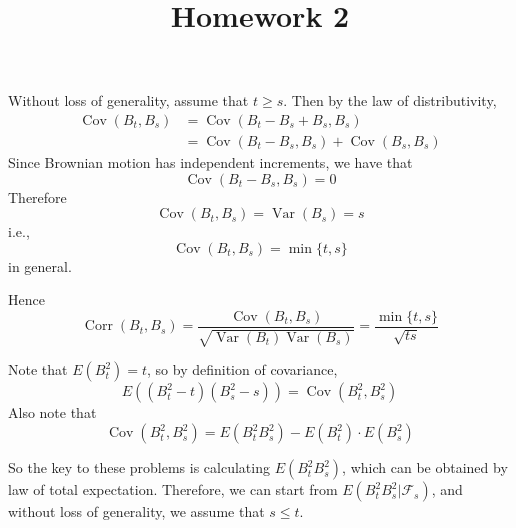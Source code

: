 \documentclass{homework}
\title{Homework 2}
\DeclareMathOperator{\Cov}{Cov}
\DeclareMathOperator{\Var}{Var}
\DeclareMathOperator{\Corr}{Corr}
\begin{document}
    \maketitle    

    \problem
    Without loss of generality, assume that $t\geq s$.
    Then by the law of distributivity,
    \begin{align*}
        \Cov(B_t,B_s)&=\Cov(B_t-B_s+B_s,B_s)\\
                     &=\Cov(B_t-B_s,B_s)+\Cov(B_s,B_s)
    \end{align*} 
    Since Brownian motion has independent increments,
    we have that
    \[\Cov(B_t-B_s,B_s)=0\]
    Therefore
    \[\Cov(B_t,B_s)=\Var(B_s)=s\]
    i.e.,
    \[\Cov(B_t,B_s)=\min\{t,s\}\]
    in general.

    Hence
    \[\Corr(B_t,B_s)=\frac{\Cov(B_t,B_s)}{\sqrt{\Var(B_t)\Var(B_s)}}
    =\frac{\min\{t,s\}}{\sqrt{ts}}\]

    \problem
    Note that $E\left(B_t^2\right)=t$, so by definition of
    covariance,
    \begin{equation}
        \label{eq:cov def}
        E\left((B_t^2-t)(B_s^2-s)\right)=\Cov(B_t^2,B_s^2)
    \end{equation}
    Also note that
    \begin{equation}
        \label{eq:cov formula}
        \Cov(B_t^2,B_s^2)=E(B_t^2B_s^2)-E(B_t^2)\cdot E(B_s^2)
    \end{equation}

    So the key to these problems is calculating $E(B_t^2B_s^2)$,
    which can be obtained by law of total expectation. Therefore,
    we can start from $E(B_t^2B_s^2|\mathcal F_s)$, and without
    loss of generality, we assume that $s\leq t$.
\end{document}
